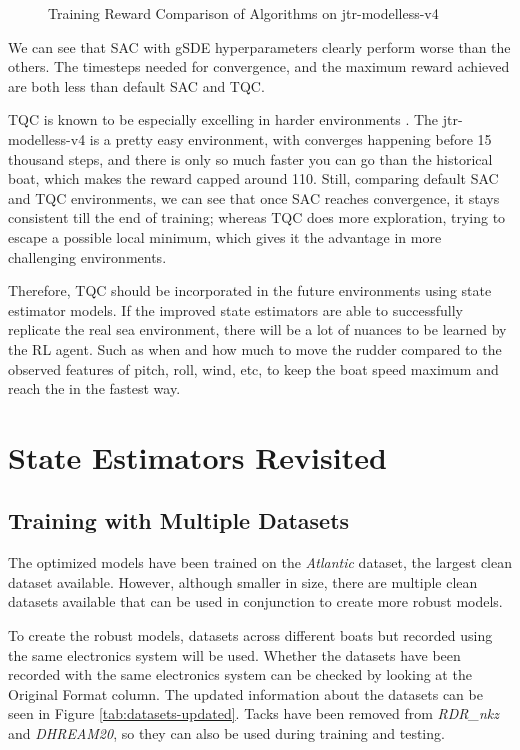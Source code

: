 \documentclass[12pt,twoside]{report}
\begin{document}
\begin{figure}[h]
\begin{subfigure}[b]{0.48\textwidth}
    \end{subfigure}
    \caption{Training Reward Comparison of Algorithms on jtr-modelless-v4}
    \label{fig:rl-comparison}
\end{figure}

We can see that SAC with gSDE hyperparameters clearly perform worse than the others. The timesteps needed for convergence, and the maximum reward achieved are both less than default SAC and TQC. 

TQC is known to be especially excelling in harder environments \cite{tqc-paper}. The jtr-modelless-v4 is a pretty easy environment, with converges happening before 15 thousand steps, and there is only so much faster you can go than the historical boat, which makes the reward capped around 110. Still, comparing default SAC and TQC environments, we can see that once SAC reaches convergence, it stays consistent till the end of training; whereas TQC does more exploration, trying to escape a possible local minimum, which gives it the advantage in more challenging environments. 

Therefore, TQC should be incorporated in the future environments using state estimator models. If the improved state estimators are able to successfully replicate the real sea environment, there will be a lot of nuances to be learned by the RL agent. Such as when and how much to move the rudder compared to the observed features of pitch, roll, wind, etc, to keep the boat speed maximum and reach the in the fastest way.

\chapter{State Estimators Revisited}

\section{Training with Multiple Datasets}
The optimized models have been trained on the \textit{Atlantic} dataset, the largest clean dataset available. However, although smaller in size, there are multiple clean datasets available that can be used in conjunction to create more robust models.

To create the robust models, datasets across different boats but recorded using the same electronics system will be used. Whether the datasets have been recorded with the same electronics system can be checked by looking at the Original Format column. The updated information about the datasets can be seen in Figure \ref{tab:datasets-updated}. Tacks have been removed from \textit{RDR\_nkz} and \textit{DHREAM20}, so they can also be used during training and testing.
\end{document}
